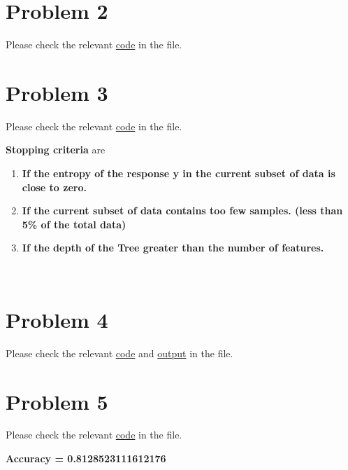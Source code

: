 \documentclass{article}
\begin{document}
\section*{Problem 2}
    \begin{center}
        Please check the relevant \href{https://github.com/z-zijie/2020Fall/blob/master/COMP760/Homework4/code.py}{code} in the file.
    \end{center}
\pagebreak

\section*{Problem 3}
    \begin{center}
        Please check the relevant \href{https://github.com/z-zijie/2020Fall/blob/master/COMP760/Homework4/code.py}{code} in the file.
    \end{center}
    \textbf{Stopping criteria} are
    \begin{enumerate}
        \item \textbf{If the entropy of the response y in the current subset of data is close to zero.}
        \item \textbf{If the current subset of data contains too few samples. (less than 5\% of the total data)}
        \item \textbf{If the depth of the Tree greater than the number of features.}
    \end{enumerate}\

\section*{Problem 4}
    \begin{center}
        Please check the relevant \href{https://github.com/z-zijie/2020Fall/blob/master/COMP760/Homework4/code.py}{code} and \href{https://github.com/z-zijie/2020Fall/blob/master/COMP760/Homework4/P4.txt}{output} in the file.
    \end{center}
    

\section*{Problem 5}
    \begin{center}
        Please check the relevant \href{https://github.com/z-zijie/2020Fall/blob/master/COMP760/Homework4/code.py}{code} in the file.
    \end{center}
    \begin{center}
        \textbf{Accuracy = 0.8128523111612176}
    \end{center}
    
\end{document}
